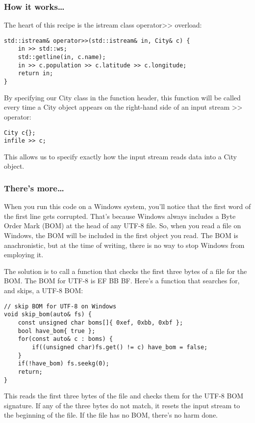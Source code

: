 \subsubsection{How it works…}

The heart of this recipe is the istream class operator>{}> overload:

\begin{lstlisting}[style=styleCXX]
std::istream& operator>>(std::istream& in, City& c) {
	in >> std::ws;
	std::getline(in, c.name);
	in >> c.population >> c.latitude >> c.longitude;
	return in;
}
\end{lstlisting}

By specifying our City class in the function header, this function will be called every time a City object appears on the right-hand side of an input stream >{}> operator:

\begin{lstlisting}[style=styleCXX]
City c{};
infile >> c;
\end{lstlisting}

This allows us to specify exactly how the input stream reads data into a City object.

\subsubsection{There's more…}

When you run this code on a Windows system, you'll notice that the first word of the first line gets corrupted. That's because Windows always includes a Byte Order Mark (BOM) at the head of any UTF-8 file. So, when you read a file on Windows, the BOM will be included in the first object you read. The BOM is anachronistic, but at the time of writing, there is no way to stop Windows from employing it.

The solution is to call a function that checks the first three bytes of a file for the BOM. The BOM for UTF-8 is EF BB BF. Here's a function that searches for, and skips, a UTF-8 BOM:

\begin{lstlisting}[style=styleCXX]
// skip BOM for UTF-8 on Windows
void skip_bom(auto& fs) {
	const unsigned char boms[]{ 0xef, 0xbb, 0xbf };
	bool have_bom{ true };
	for(const auto& c : boms) {
		if((unsigned char)fs.get() != c) have_bom = false;
	}
	if(!have_bom) fs.seekg(0);
	return;
}
\end{lstlisting}

This reads the first three bytes of the file and checks them for the UTF-8 BOM signature. If any of the three bytes do not match, it resets the input stream to the beginning of the file. If the file has no BOM, there's no harm done.

